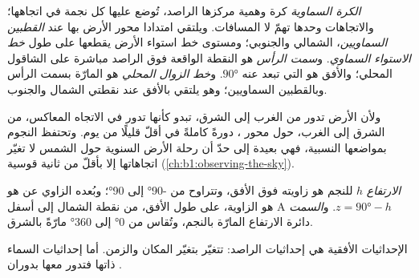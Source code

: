 \begin{definition}\label{def:b1:spherical-astronomy:celestial-sphere}
\emph{الكرة السماوية} كرة وهمية مركزها الراصد، تُوضع عليها كل نجمة في اتجاهها؛ والاتجاهات وحدها تهمّ لا المسافات. ويلتقي امتدادا محور الأرض بها عند \emph{القطبين السماويين}، الشمالي والجنوبي؛ ومستوى خط استواء الأرض يقطعها على طول \emph{خط الاستواء السماوي}. و\emph{سمت الرأس} هو النقطة الواقعة فوق الراصد مباشرة على الشاقول المحلي؛ والأفق هو  التي تبعد عنه $\ang{90}$. و\emph{خط الزوال المحلي} هو  المارّة بسمت الرأس وبالقطبين السماويين؛ وهو يلتقي بالأفق عند نقطتي الشمال والجنوب.
\end{definition}

ولأن الأرض تدور من الغرب إلى الشرق، تبدو  كأنها تدور في الاتجاه المعاكس، من الشرق إلى الغرب، حول محور ، دورةً كاملةً في أقلّ قليلًا من يوم. وتحتفظ النجوم بمواضعها النسبية، فهي بعيدة إلى حدّ أن رحلة الأرض السنوية حول الشمس لا تغيّر اتجاهاتها إلا بأقلّ من ثانية قوسية (\cref{ch:b1:observing-the-sky}).

\begin{definition}\label{def:b1:spherical-astronomy:horizontal}
\emph{الارتفاع} $h$ للنجم هو زاويته فوق الأفق، وتتراوح من \ang{-90} إلى \ang{90}؛ وبُعده الزاوي عن  هو $z = \ang{90} - h$. و\emph{السمت} $\mathrm{A}$ هو الزاوية، على طول الأفق، من نقطة الشمال إلى أسفل دائرة الارتفاع المارّة بالنجم، وتُقاس من \ang{0} إلى \ang{360} مارّةً بالشرق.
\end{definition}

الإحداثيات الأفقية هي إحداثيات الراصد: تتغيّر بتغيّر المكان والزمن. أما إحداثيات السماء ذاتها فتدور معها بدوران .

